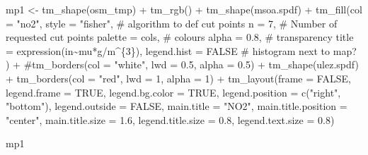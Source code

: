 \documentclass[
  letterpaper,
]{scrbook}
\newenvironment{Shaded}{\begin{snugshade}}{\end{snugshade}}
\newcommand{\AttributeTok}[1]{\textcolor[rgb]{0.40,0.45,0.13}{#1}}
\newcommand{\CommentTok}[1]{\textcolor[rgb]{0.37,0.37,0.37}{#1}}
\newcommand{\ConstantTok}[1]{\textcolor[rgb]{0.56,0.35,0.01}{#1}}
\newcommand{\DecValTok}[1]{\textcolor[rgb]{0.68,0.00,0.00}{#1}}
\newcommand{\FloatTok}[1]{\textcolor[rgb]{0.68,0.00,0.00}{#1}}
\newcommand{\FunctionTok}[1]{\textcolor[rgb]{0.28,0.35,0.67}{#1}}
\newcommand{\NormalTok}[1]{\textcolor[rgb]{0.00,0.23,0.31}{#1}}
\newcommand{\OtherTok}[1]{\textcolor[rgb]{0.00,0.23,0.31}{#1}}
\newcommand{\SpecialCharTok}[1]{\textcolor[rgb]{0.37,0.37,0.37}{#1}}
\newcommand{\StringTok}[1]{\textcolor[rgb]{0.13,0.47,0.30}{#1}}
\begin{document}
\begin{Shaded}
\begin{Highlighting}[]
\NormalTok{mp1 }\OtherTok{\textless{}{-}}  \FunctionTok{tm\_shape}\NormalTok{(osm\_tmp) }\SpecialCharTok{+} \FunctionTok{tm\_rgb}\NormalTok{() }\SpecialCharTok{+}
  \FunctionTok{tm\_shape}\NormalTok{(msoa.spdf) }\SpecialCharTok{+} 
  \FunctionTok{tm\_fill}\NormalTok{(}\AttributeTok{col =} \StringTok{"no2"}\NormalTok{, }
          \AttributeTok{style =} \StringTok{"fisher"}\NormalTok{, }\CommentTok{\# algorithm to def cut points}
          \AttributeTok{n =} \DecValTok{7}\NormalTok{, }\CommentTok{\# Number of requested cut points}
          \AttributeTok{palette =}\NormalTok{ cols, }\CommentTok{\# colours}
          \AttributeTok{alpha =} \FloatTok{0.8}\NormalTok{, }\CommentTok{\# transparency }
          \AttributeTok{title =} \FunctionTok{expression}\NormalTok{(}\StringTok{\textquotesingle{}in\textquotesingle{}}\SpecialCharTok{\textasciitilde{}}\NormalTok{mu}\SpecialCharTok{*}\StringTok{\textquotesingle{}g\textquotesingle{}}\SpecialCharTok{/}\NormalTok{m}\SpecialCharTok{\^{}}\NormalTok{\{}\DecValTok{3}\NormalTok{\}), }
          \AttributeTok{legend.hist =} \ConstantTok{FALSE} \CommentTok{\# histogram next to map?}
\NormalTok{          ) }\SpecialCharTok{+}
  \CommentTok{\#tm\_borders(col = "white", lwd = 0.5, alpha = 0.5) +}
  \FunctionTok{tm\_shape}\NormalTok{(ulez.spdf) }\SpecialCharTok{+}
  \FunctionTok{tm\_borders}\NormalTok{(}\AttributeTok{col =} \StringTok{"red"}\NormalTok{, }\AttributeTok{lwd =} \DecValTok{1}\NormalTok{, }\AttributeTok{alpha =} \DecValTok{1}\NormalTok{) }\SpecialCharTok{+}
  \FunctionTok{tm\_layout}\NormalTok{(}\AttributeTok{frame =} \ConstantTok{FALSE}\NormalTok{,}
            \AttributeTok{legend.frame =} \ConstantTok{TRUE}\NormalTok{, }\AttributeTok{legend.bg.color =} \ConstantTok{TRUE}\NormalTok{,}
            \AttributeTok{legend.position =} \FunctionTok{c}\NormalTok{(}\StringTok{"right"}\NormalTok{, }\StringTok{"bottom"}\NormalTok{),}
            \AttributeTok{legend.outside =} \ConstantTok{FALSE}\NormalTok{,}
            \AttributeTok{main.title =} \StringTok{"NO2"}\NormalTok{, }
            \AttributeTok{main.title.position =} \StringTok{"center"}\NormalTok{,}
            \AttributeTok{main.title.size =} \FloatTok{1.6}\NormalTok{,}
            \AttributeTok{legend.title.size =} \FloatTok{0.8}\NormalTok{,}
            \AttributeTok{legend.text.size =} \FloatTok{0.8}\NormalTok{)}

\NormalTok{mp1}
\end{Highlighting}
\end{Shaded}
\end{document}
